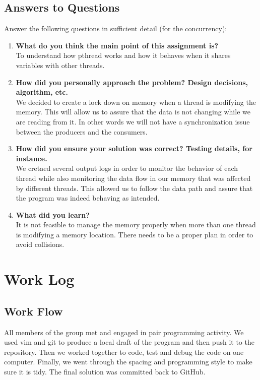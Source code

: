 \documentclass[journal,10pt,onecolumn,compsoc,letterpaper,draftclsnofoot,table,xcdraw]{IEEEtran} \usepackage[margin=0.75in]{geometry}
\begin{document}
\subsection{Answers to Questions}
\noindent Answer the following questions in sufficient detail (for the concurrency):
\begin{enumerate}
\item \textbf{What do you think the main point of this assignment is?} \\
To understand how pthread works and how it behaves when it shares variables with other threads.
\item \textbf{How did you personally approach the problem? Design decisions, algorithm, etc.} \\
We decided to create a lock down on memory when a thread is modifying the memory. This will allow us to assure that the 
data is not changing while we are reading from it. In other words we will not have a synchronization issue between the
producers and the consumers.
\item \textbf{How did you ensure your solution was correct? Testing details, for instance.} \\
We cretaed several output logs in order to monitor the behavior of each thread while also monitoring the data flow 
in our memory that was affected by different threads. This allowed us to follow the data path and assure that the program
was indeed behaving as intended.
\item \textbf{What did you learn?} \\
It is not feasible to manage the memory properly when more than one thread is modifying a memory location. There needs 
to be a proper plan in order to avoid collisions.
\end{enumerate}
\section{Work Log}
\subsection{Work Flow}
\noindent All members of the group met and engaged in pair programming activity. We used vim and git to produce a local draft of the program and then push it to the repository. Then we worked together to code, test and debug the code on one computer. Finally, we went through the spacing and programming style to make sure it is tidy. The final solution was committed back to GitHub.
\end{document}
